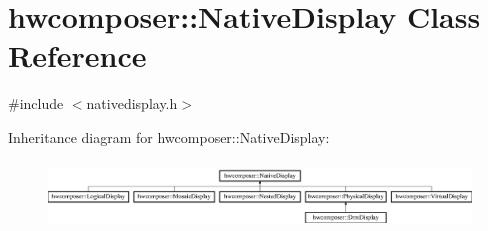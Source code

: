 \hypertarget{classhwcomposer_1_1NativeDisplay}{}\section{hwcomposer\+:\+:Native\+Display Class Reference}
\label{classhwcomposer_1_1NativeDisplay}


{\ttfamily \#include $<$nativedisplay.\+h$>$}

Inheritance diagram for hwcomposer\+:\+:Native\+Display\+:\begin{figure}[H]
\begin{center}
\leavevmode
\includegraphics[height=1.796791cm]{classhwcomposer_1_1NativeDisplay}
\end{center}
\end{figure}
